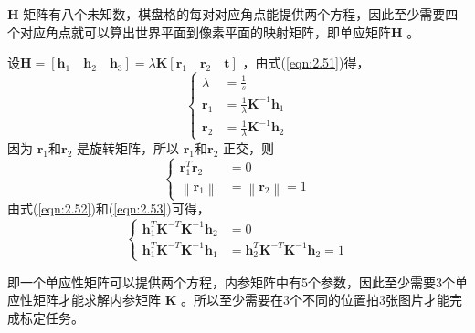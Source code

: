 $\bm{H} $ 矩阵有八个未知数，棋盘格的每对对应角点能提供两个方程，因此至少需要四个对应角点就可以算出世界平面到像素平面的映射矩阵，即单应矩阵$\bm{H} $ 。

设$\bm{H}=[ \bm{h}_1 \quad \bm{h}_2 \quad  \bm{h}_3 ]=\lambda \bm{K}[ \bm{r}_1 \quad \bm{r}_2 \quad  \bm{t} ] $ ，由式(\ref{eqn:2.51})得，
\begin{equation}
\label{eqn:2.52}
\left\{
\begin{aligned}
\lambda &= \frac{1}{s} \\ 
\bm{r}_{1} &= \frac{1}{\lambda} \bm{K}^{-1} \bm{h}_{1} \\ 
\bm{r}_{2} &= \frac{1}{\lambda} \bm{K}^{-1} \bm{h}_{2}
\end{aligned}
\right.
\end{equation}
因为 $\bm{r}_1 $和$\bm{r}_2 $ 是旋转矩阵，所以  $\bm{r}_1 $和$\bm{r}_2 $ 正交，则
\begin{equation}
\label{eqn:2.53}
\left\{
\begin{aligned}
\bm{r}_{1}^{T} \bm{r}_{2}&=0 \\ 
\left\|\bm{r}_{1}\right\|&=\left\|\bm{r}_{2}\right\|=1
\end{aligned}
\right.
\end{equation}
由式(\ref{eqn:2.52})和(\ref{eqn:2.53})可得，
\begin{equation}
\label{eqn:2.54}
\left\{
\begin{aligned} 
\bm{h}_{1}^{T} \bm{K}^{-T} \bm{K}^{-1} \bm{h}_{2} &=0 \\ 
\bm{h}_{1}^{T} \bm{K}^{-T} \bm{K}^{-1} \bm{h}_{1} &=\bm{h}_{2}^{T} \bm{K}^{-T} \bm{K}^{-1} \bm{h}_{2}=1
\end{aligned}
\right.
\end{equation}

即一个单应性矩阵可以提供两个方程，内参矩阵中有5个参数，因此至少需要3个单应性矩阵才能求解内参矩阵 $\bm{K} $ 。所以至少需要在3个不同的位置拍3张图片才能完成标定任务。

